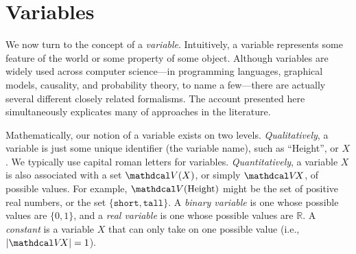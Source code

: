 %



\section{Variables}
    \label{ssec:basic-vars}
We now turn to the concept of a \emph{variable}.
Intuitively, a variable represents some feature of the world or some property of some object. 
Although variables are widely used across computer science---in programming languages, graphical models, causality, and probability theory, to name a few---there are actually several different closely related formalisms. 
The account presented here simultaneously explicates many of approaches in the literature. 

Mathematically, our notion of a variable exists on two levels.
\emph{Qualitatively}, a variable is just some unique identifier (the variable name), such as ``Height'', or $X$. 
We typically use capital roman letters for variables.
\emph{Quantitatively}, a variable $X$ is also associated with a set $\V(X)$, or simply $\V\!X$, of possible values. 
For example, $\V(\text{Height})$ might be the set of positive real numbers, 
    or the set $\{ \texttt{short}, \texttt{tall} \}$. 
A \emph{binary variable} is one whose possible values are $\{0, 1\}$, and a 
    \emph{real variable} is one whose possible values are $\mathbb R$. 
A \emph{constant} is a variable $X$ that can only take on one possible value (i.e., $|\V\! X| = 1$).

